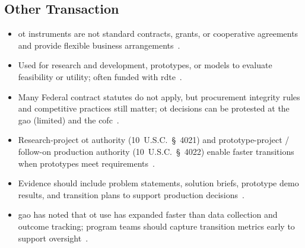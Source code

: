 \documentclass[../main.tex]{subfiles}
\begin{document}
\subsection{Other Transaction}
\begin{itemize}
  \item \ac{ot} instruments are not standard contracts, grants, or cooperative agreements and provide flexible business arrangements~\autocite{edo-3-2-2-solicitation-prep-2025}.
  \item Used for research and development, prototypes, or models to evaluate feasibility or utility; often funded with \ac{rdte}~\autocite{edo-3-2-2-solicitation-prep-2025}.
  \item Many Federal contract statutes do not apply, but procurement integrity rules and competitive practices still matter; \ac{ot} decisions can be protested at the \ac{gao} (limited) and the \ac{cofc}~\autocite{edo-3-2-2-solicitation-prep-2025}.
  \item Research-project \ac{ot} authority (10~U.S.C.\ \S~4021) and prototype-project / follow-on production authority (10~U.S.C.\ \S~4022) enable faster transitions when prototypes meet requirements~\autocite{USC-4021-OTA,USC-4022-OTF}.
  \item Evidence should include problem statements, solution briefs, prototype demo results, and transition plans to support production decisions~\autocite{DIU-Work-With-Us-2026}.
  \item \ac{gao} has noted that \ac{ot} use has expanded faster than data collection and outcome tracking; program teams should capture transition metrics early to support oversight~\autocite{GAO-20-84}.
\end{itemize}
\end{document}
